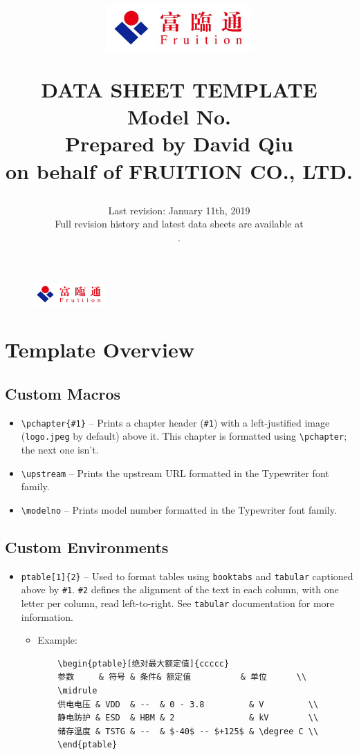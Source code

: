 \documentclass{scrreprt}
\title{
	\begin{figure}[H]
		\centering\includegraphics[width=0.5\textwidth]{logo.jpeg}
	\end{figure}
	\vspace{1cm}
	\flushright
	\Huge{DATA SHEET TEMPLATE}\\
	\vspace{2cm}
	\huge{Model No. \modelno}\\
	\vspace{2cm}
	\LARGE{Prepared by David Qiu \\ on behalf of FRUITION CO., LTD.}
}
\date{
	Last revision: January 11th, 2019\\
	\vspace{0.5cm}
	Full revision history and latest data sheets are available at\\
	\vspace{0.25cm}
	\upstream.
}
\newcommand{\pchapter}[1]{
	\begingroup\let\clearpage\relax
	\newpage
	\begin{figure}[H]
		\includegraphics[width=0.25\textwidth]{logo.jpeg}
	\end{figure}
	\chapter{#1}
	\endgroup
}
\newcommand{\modelno}{
	\texttt{<++>}
}
\newcommand{\upstream}{
	\small\texttt{https://github.com/diracs-delta/fruition-specs/%
		      tree/master/<++>}
}
\newenvironment{ptable}[2][def]
{
	\begin{table}[H]
	\centering
	\rowcolors{1}{white}{light-gray}
	\caption{#1}
	\begin{tabular}{#2}
	\toprule
}
{
	\bottomrule
	\end{tabular}
	\end{table}
}
\begin{document}
\begin{CJK*}{UTF8}{gbsn}
\maketitle
\tableofcontents

\pchapter{Template Overview}
\section{Custom Macros}
\begin{itemize}
\item \verb|\pchapter{#1}| -- Prints a chapter header (\verb|#1|) with a
left-justified image (\verb|logo.jpeg| by default) above it. This chapter is
formatted using \verb|\pchapter|; the next one isn't.

\item \verb|\upstream| -- Prints the upstream URL formatted in the Typewriter
font family.

\item \verb|\modelno| -- Prints model number formatted in the Typewriter font
family.
\end{itemize}

\section{Custom Environments}
\begin{itemize}
\item \verb|ptable[1]{2}| -- Used to format tables using \verb|booktabs| and
\verb|tabular| captioned above by \verb|#1|. \verb|#2| defines the alignment of
the text in each column, with one letter per column, read left-to-right. See
\verb|tabular| documentation for more information.

	\begin{itemize}
	\item Example:

	\begin{verbatim}
	\begin{ptable}[绝对最大额定值]{ccccc}
	参数     & 符号 & 条件& 额定值          & 单位      \\
	\midrule
	供电电压 & VDD  & --  & 0 - 3.8         & V         \\
	静电防护 & ESD  & HBM & 2               & kV        \\
	储存温度 & TSTG & --  & $-40$ -- $+125$ & \degree C \\
	\end{ptable}
	\end{verbatim}


\end{itemize}
\end{itemize}
\end{CJK*}
\end{document}
